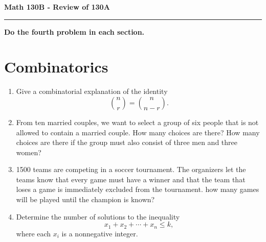 \documentclass[11pt,letterpaper]{article}
\begin{document}
\begin{center}
{\bf \Large Math 130B - Review of 130A}
\vspace{0.2cm}
\hrule
\end{center}

\textbf{Do the fourth problem in each section.}
\section{Combinatorics}
\begin{enumerate}
	\item Give a combinatorial explanation of the identity
		\[
		\binom{n}{r} = \binom{n}{n-r}.
		\]


	\item From ten married couples, we want to select a group of six people that is not allowed to contain a married couple. How many choices are there? How many choices are there if the group must also consist of three men and three women?


	\item 1500 teams are competing in a soccer tournament. The organizers let the teams know that every game must have a winner and that the team that loses a game is immediately excluded from the tournament. how many games will be played until the champion is known?

	\item Determine the number of solutions to the inequality 
	\[
		x_1 + x_2 + \cdots + x_n \leq k,
	\]
	where each $x_i$ is a nonnegative integer.


\end{enumerate}
\end{document}
